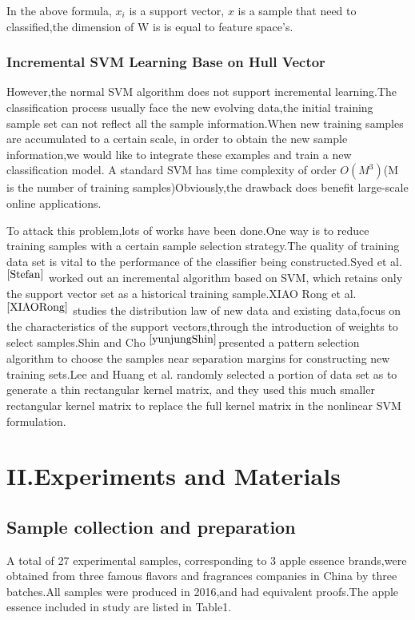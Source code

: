\documentclass[a4paper]{article}
\begin{document}
In the above formula, $x_i$ is a support vector, $x$ is a sample that need to classified,the dimension of W is is equal to feature space's.

    \subsubsection{Incremental SVM Learning Base on Hull Vector}

However,the normal SVM algorithm does not support incremental learning.The classification process usually face the new evolving data,the initial training sample set can not reflect all the sample information.When new training samples are accumulated to a certain scale, in order to obtain the new sample information,we would like to integrate these examples and train a new classification model.
A standard SVM has time complexity of order $O(M^3)$(M is the number of training samples)Obviously,the drawback does benefit large-scale online applications.

To attack this problem,lots of works have been done.One way is to reduce training samples with a certain sample selection strategy.The quality of training data set is vital to the performance of the classifier being constructed.Syed et al.$ ^{\cite{Stefan}}$ worked out an incremental algorithm based on SVM, which retains only the support vector set as a historical training sample.XIAO Rong et al. $ ^{\cite{XIAORong}}$ studies the distribution law of new data and existing data,focus on  the characteristics of the support vectors,through the introduction of weights to select samples.Shin and Cho $^{\cite{yunjungShin}}$presented a pattern selection algorithm to choose the samples near separation margins for constructing new training sets.Lee and Huang et al. \cite{YJLee} randomly selected a portion of data set as to generate a thin rectangular kernel matrix, and they used this much smaller rectangular kernel matrix to replace the full kernel matrix in the nonlinear SVM formulation.

\section{II.Experiments and Materials}
\subsection{Sample collection and preparation}
A total of 27 experimental samples, corresponding to 3 apple essence brands,were obtained from three famous flavors and fragrances companies in China by three batches.All samples were produced in 2016,and had equivalent proofs.The apple essence included in study are listed in Table1.
\end{document}
